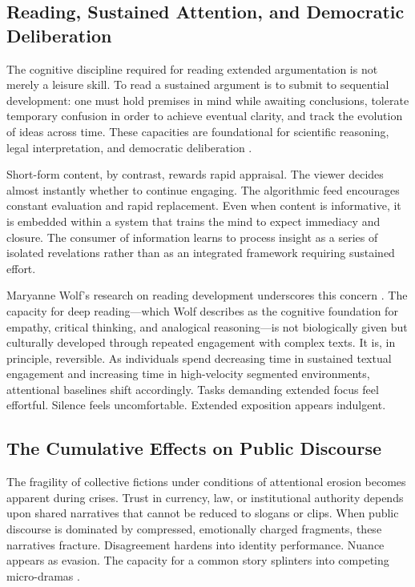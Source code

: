 \documentclass[12pt]{article}
\begin{document}
\subsection{Reading, Sustained Attention, and Democratic Deliberation}

The cognitive discipline required for reading extended argumentation is not merely a leisure skill. To read a sustained argument is to submit to sequential development: one must hold premises in mind while awaiting conclusions, tolerate temporary confusion in order to achieve eventual clarity, and track the evolution of ideas across time. These capacities are foundational for scientific reasoning, legal interpretation, and democratic deliberation \citep{Postman1985, Carr2010}.

Short-form content, by contrast, rewards rapid appraisal. The viewer decides almost instantly whether to continue engaging. The algorithmic feed encourages constant evaluation and rapid replacement. Even when content is informative, it is embedded within a system that trains the mind to expect immediacy and closure. The consumer of information learns to process insight as a series of isolated revelations rather than as an integrated framework requiring sustained effort.

Maryanne Wolf's research on reading development underscores this concern \citep{Wolf2018}. The capacity for deep reading---which Wolf describes as the cognitive foundation for empathy, critical thinking, and analogical reasoning---is not biologically given but culturally developed through repeated engagement with complex texts. It is, in principle, reversible. As individuals spend decreasing time in sustained textual engagement and increasing time in high-velocity segmented environments, attentional baselines shift accordingly. Tasks demanding extended focus feel effortful. Silence feels uncomfortable. Extended exposition appears indulgent.

\subsection{The Cumulative Effects on Public Discourse}

The fragility of collective fictions under conditions of attentional erosion becomes apparent during crises. Trust in currency, law, or institutional authority depends upon shared narratives that cannot be reduced to slogans or clips. When public discourse is dominated by compressed, emotionally charged fragments, these narratives fracture. Disagreement hardens into identity performance. Nuance appears as evasion. The capacity for a common story splinters into competing micro-dramas \citep{Lanier2018}.
\end{document}
